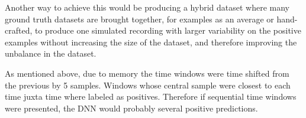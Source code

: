 Another way to achieve this would be producing a hybrid dataset where many ground truth datasets are brought together, for examples as an average or hand-crafted, to produce one simulated recording with larger variability on the positive examples without increasing the size of the dataset, and therefore improving the unbalance in the dataset.

As mentioned above, due to memory the time windows were time shifted from the previous by 5 samples. Windows whose central sample were closest to each time juxta time where labeled as positives. Therefore if sequential time windows were presented, the DNN would probably several positive predictions.